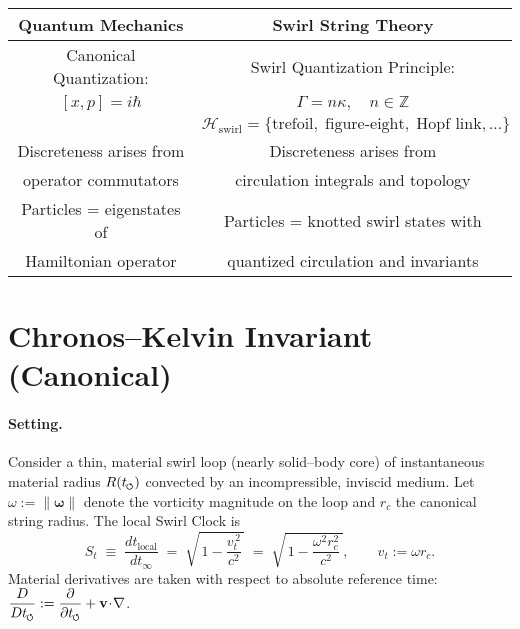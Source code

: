 \documentclass[11pt]{article}
\begin{document}
    \begin{center}
        \begin{tabular}{|c|c|}
            \hline
            \textbf{Quantum Mechanics} & \textbf{Swirl String Theory} \\
            \hline
            Canonical Quantization: & Swirl Quantization Principle: \\
            $[x, p] = i \hbar$ & $\Gamma = n \kappa, \quad n \in \mathbb{Z}$ \\[6pt]
            & $\mathcal{H}_\text{swirl} =
            \{ \text{trefoil}, \; \text{figure-eight}, \; \text{Hopf link}, \dots \}$ \\
            \hline
            Discreteness arises from & Discreteness arises from \\
            operator commutators & circulation integrals and topology \\
            \hline
            Particles = eigenstates of & Particles = knotted swirl states with \\
            Hamiltonian operator & quantized circulation and invariants \\
            \hline
        \end{tabular}
    \end{center}


    \section{Chronos–Kelvin Invariant (Canonical)}
    \label{sec:chronos_kelvin}

    \paragraph{Setting.}
    Consider a thin, material swirl loop (nearly solid–body core) of instantaneous material radius
    $R(t_{\swirlarrow})$ convected by an incompressible, inviscid medium. Let $\omega:=\|\boldsymbol{\omega}\|$ denote the
    vorticity magnitude on the loop and $r_c$ the canonical string radius. The local Swirl Clock is
    \begin{equation}
        S_t \;\equiv\; \frac{dt_{\text{local}}}{dt_\infty}
        \;=\;
        \sqrt{\,1-\frac{v_t^{\,2}}{c^2}\,}
        \;=\;
        \sqrt{\,1-\frac{\omega^2 r_c^2}{c^2}\,},\qquad v_t:=\omega r_c .
        \label{eq:SwirlClock-def}
    \end{equation}
    Material derivatives are taken with respect to absolute reference time:
    $\displaystyle \frac{D}{Dt_{\swirlarrow}}:=\frac{\partial}{\partial t_{\swirlarrow}}+\mathbf{v}\!\cdot\!\nabla$.
\end{document}
